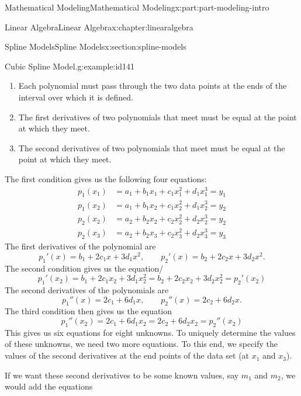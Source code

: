 \documentclass[oneside,10pt,]{book}
\numberwithin{equation}{section}
\newcommand{\amp}{&}
\begin{document}
\begin{partptx}{Mathematical Modeling}{}{Mathematical Modeling}{}{}{x:part:part-modeling-intro}
\begin{chapterptx}{Linear Algebra}{}{Linear Algebra}{}{}{x:chapter:linearalgebra}
\begin{sectionptx}{Spline Models}{}{Spline Models}{}{}{x:section:spline-models}
\begin{example}{Cubic Spline Model.}{g:example:id141}
%
\begin{enumerate}
\item{}Each polynomial must pass through the two data points at the ends of the interval over which it is defined.%
\item{}The first derivatives of two polynomials that meet must be equal at the point at which they meet.%
\item{}The second derivatives of two polynomials that meet must be equal at the point at which they meet.%
\end{enumerate}
The first condition gives us the following four equations:%
%
\begin{equation*}
\begin{aligned}
p_1(x_1) \amp= a_1 + b_1 x_1 + c_1 x_1^2 + d_1 x_1^3 = y_1 \\
p_1(x_2) \amp= a_1 + b_1 x_2 + c_1 x_2^2 + d_1 x_2^3 = y_2 \\
p_2(x_2) \amp= a_2 + b_2 x_2 + c_2 x_2^2 + d_2 x_2^3 = y_2 \\
p_2(x_3) \amp= a_2 + b_2 x_3 + c_2 x_3^2 + d_2 x_3^3 = y_3
\end{aligned}
\end{equation*}
The first derivatives of the polynomial are%
%
\begin{equation*}
p_1'(x) = b_1 + 2c_1 x + 3d_1 x^2, \qquad p_2'(x) = b_2 + 2c_2 x + 3d_2 x^2.
\end{equation*}
The second condition gives us the equation\slash{}%
%
\begin{equation*}
p_1'(x_2) = b_1 + 2c_1 x_2 + 3d_1 x_2^2 = b_2 + 2c_2 x_2 + 3d_2 x_2^2 = p_2'(x_2)
\end{equation*}
The second derivatives of the polynomials are%
%
\begin{equation*}
p_1''(x) = 2c_1 + 6d_1 x, \qquad p_2''(x) = 2c_2 + 6d_2 x.
\end{equation*}
The third condition then gives us the equation%
%
\begin{equation*}
p_1''(x_2) = 2c_1 + 6d_1x_2 = 2c_2 + 6d_2x_2 = p_2''(x_2)
\end{equation*}
This gives us six equations for eight unknowns.  To uniquely determine the values of these unknowns, we need two more equations.  To this end, we specify the values of the second derivatives at the end points of the data set (at \(x_1\) and \(x_3\)).%
\par
If we want these second derivatives to be some known values, say \(m_1\) and \(m_2\), we would add the equations%
%
\begin{equation*}

\end{equation*}
\end{example}
\end{sectionptx}
\end{chapterptx}
\end{partptx}
\end{document}
